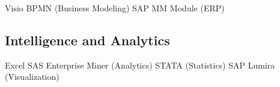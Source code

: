 \documentclass[letterpaper]{deedy-resume} %
\begin{document}
\begin{minipage}[t]{0.33\textwidth}
Visio \textbullet{} BPMN (Business Modeling) \textbullet{} SAP MM Module (ERP)

\sectionspace %

\subsection{Intelligence and Analytics}
Excel \textbullet{} SAS Enterprise Miner (Analytics) \textbullet{} STATA (Statistics)\textbullet{} SAP Lumira (Visualization) \\


\end{minipage} %
\hfill
%
%
\end{document}
